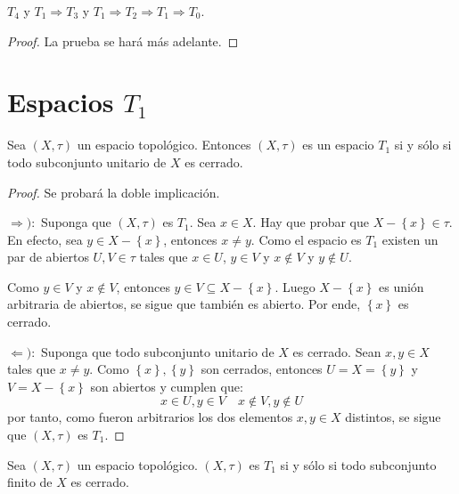 \documentclass[12pt]{report}
\theoremstyle{largebreak}
\begin{document}
    \begin{propo}
        $T_4$ y $T_1\Rightarrow T_3$ y $T_1\Rightarrow T_2\Rightarrow T_1\Rightarrow T_0$.
    \end{propo}

    \begin{proof}
        La prueba se hará más adelante.
    \end{proof}

    \section{Espacios $T_1$}
    
    \begin{propo}
        Sea $(X,\tau)$ un espacio topológico. Entonces $(X,\tau)$ es un espacio $T_1$ si y sólo si todo subconjunto unitario de $X$ es cerrado.
    \end{propo}

    \begin{proof}
        Se probará la doble implicación.

        $\Rightarrow):$ Suponga que $(X,\tau)$ es $T_1$. Sea $x\in X$. Hay que probar que $X-\left\{x \right\}\in\tau$. En efecto, sea $y\in X-\left\{x \right\}$, entonces $x\neq y$. Como el espacio es $T_1$ existen un par de abiertos $U,V\in\tau$ tales que $x\in U$, $y\in V$ y $x\notin V$ y $y\notin U$.

        Como $y\in V$ y $x\notin V$, entonces $y\in V\subseteq X-\left\{x\right\}$. Luego $X-\left\{x\right\}$ es unión arbitraria de abiertos, se sigue que también es abierto. Por ende, $\left\{x\right\}$ es cerrado.

        $\Leftarrow):$ Suponga que todo subconjunto unitario de $X$ es cerrado. Sean $x,y\in X$ tales que $x\neq y$. Como $\left\{x\right\},\left\{y\right\}$ son cerrados, entonces $U=X=\left\{y\right\}$ y $V=X-\left\{x\right\}$ son abiertos y cumplen que:
        \begin{equation*}
            x\in U,y\in V\quad x\notin V,y\notin U
        \end{equation*}
        por tanto, como fueron arbitrarios los dos elementos $x,y\in X$ distintos, se sigue que $(X,\tau)$ es $T_1$.
    \end{proof}

    \begin{cor}
        Sea $(X,\tau)$ un espacio topológico. $(X,\tau)$ es $T_1$ si y sólo si todo subconjunto finito de $X$ es cerrado.
    \end{cor}
\end{document}
